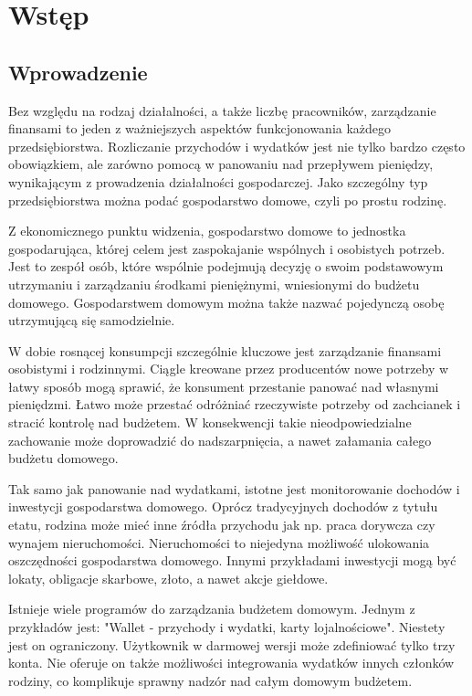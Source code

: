 \chapter{Wstęp}
\section{Wprowadzenie}
Bez względu na rodzaj działalności, a także liczbę pracowników, zarządzanie finansami to jeden z ważniejszych aspektów funkcjonowania każdego przedsiębiorstwa. Rozliczanie przychodów i wydatków jest nie tylko bardzo często obowiązkiem, ale zarówno pomocą w panowaniu nad przepływem pieniędzy, wynikającym z prowadzenia działalności gospodarczej. Jako szczególny typ przedsiębiorstwa można podać gospodarstwo domowe, czyli po prostu rodzinę.

Z ekonomicznego punktu widzenia, gospodarstwo domowe to jednostka gospodarująca, której celem jest zaspokajanie wspólnych i osobistych potrzeb. Jest to zespół osób, które wspólnie podejmują decyzję o swoim podstawowym utrzymaniu i zarządzaniu środkami pieniężnymi, wniesionymi do budżetu domowego. Gospodarstwem domowym można także nazwać pojedynczą osobę utrzymującą się samodzielnie.

W dobie rosnącej konsumpcji szczególnie kluczowe jest zarządzanie finansami osobistymi i rodzinnymi. Ciągle kreowane przez producentów nowe potrzeby w łatwy sposób mogą sprawić, że konsument przestanie panować nad własnymi pieniędzmi. Łatwo może przestać odróżniać rzeczywiste potrzeby od zachcianek i stracić kontrolę nad budżetem. W konsekwencji takie nieodpowiedzialne zachowanie może doprowadzić do nadszarpnięcia, a nawet załamania całego budżetu domowego.

Tak samo jak panowanie nad wydatkami, istotne jest monitorowanie dochodów i inwestycji gospodarstwa domowego. Oprócz tradycyjnych dochodów z tytułu etatu, rodzina może mieć inne źródła przychodu jak np. praca dorywcza czy wynajem nieruchomości. Nieruchomości to niejedyna możliwość ulokowania oszczędności gospodarstwa domowego. Innymi przykładami inwestycji mogą być lokaty, obligacje skarbowe, złoto, a nawet akcje giełdowe.

Istnieje wiele programów do zarządzania budżetem domowym. Jednym z przykładów jest: "Wallet - przychody i wydatki, karty lojalnościowe". Niestety jest on ograniczony. Użytkownik w darmowej wersji może zdefiniować tylko trzy konta. Nie oferuje on także możliwości integrowania wydatków innych członków rodziny, co komplikuje sprawny nadzór nad całym domowym budżetem.


